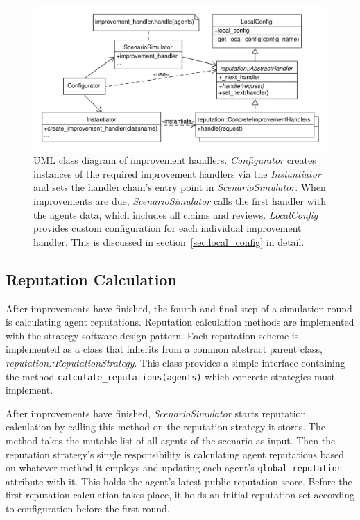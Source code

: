 \documentclass[%
    ]{\PathToTumTemplate/thesis/tum_thesis}
\begin{document}
\begin{figure}[tbp]
  \begin{center}
        \includegraphics[width=1\linewidth]	{../uml/improvement_handlers.pdf}
    \caption{
	UML class diagram of improvement handlers. 
	\emph{Configurator} creates instances of the required improvement handlers via the \emph{Instantiator} and sets the handler chain's entry point in \emph{ScenarioSimulator}.
	When improvements are due, \emph{ScenarioSimulator} calls the first handler with the agents data, which includes all claims and reviews.
	\emph{LocalConfig} provides custom configuration for each individual improvement handler.
	This is discussed in section~\ref{sec:local_config} in detail.
    }
    \label{fig:improvement_handlers}
  \end{center}
\end{figure}

\subsection{Reputation Calculation}\label{sec:impl_reputation_calculation}

After improvements have finished, the fourth and final step of a simulation round is calculating agent reputations.
Reputation calculation methods are implemented with the strategy software design pattern.
Each reputation scheme is implemented as a class that inherits from a common abstract parent class, \emph{reputation::ReputationStrategy}.
This class provides a simple interface containing the method \texttt{calculate\_reputations(agents)} which concrete strategies must implement.

After improvements have finished, \emph{ScenarioSimulator} starts reputation calculation by calling this method on the reputation strategy it stores.
The method takes the mutable list of all agents of the scenario as input.
Then the reputation strategy's single responsibility is calculating agent reputations based on whatever method it employs and updating each agent's \texttt{global\_reputation} attribute with it.
This holds the agent's latest public reputation score.
Before the first reputation calculation takes place, it holds an initial reputation set according to configuration before the first round.
\end{document}
